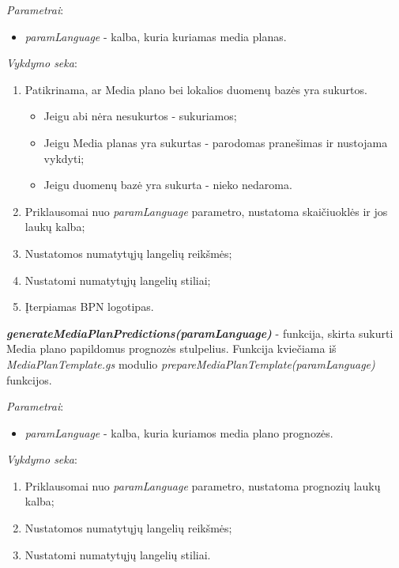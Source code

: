 \bigskip
\textit{Parametrai}:
\begin{itemize}
    \itemsep0em 
    \item \textit{paramLanguage} - kalba, kuria kuriamas media planas.
\end{itemize}

\bigskip
\textit{Vykdymo seka}:
\begin{enumerate}
    \itemsep0em 
    \item Patikrinama, ar Media plano bei lokalios duomenų bazės yra sukurtos.
    \begin{itemize}
    \itemsep0em 
        \item Jeigu abi nėra nesukurtos - sukuriamos;
        \item Jeigu Media planas yra sukurtas - parodomas pranešimas ir nustojama vykdyti;
        \item Jeigu duomenų bazė yra sukurta - nieko nedaroma.
    \end{itemize}
    \item Priklausomai nuo \textit{paramLanguage} parametro, nustatoma skaičiuoklės ir jos laukų kalba;
    \item Nustatomos numatytųjų langelių reikšmės;
    \item Nustatomi numatytųjų langelių stiliai;
    \item Įterpiamas BPN logotipas.
\end{enumerate}

\bigskip
\textit{\textbf{generateMediaPlanPredictions(paramLanguage)}} - funkcija, skirta sukurti Media plano papildomus prognozės stulpelius. Funkcija kviečiama iš \textit{MediaPlanTemplate.gs} modulio \textit{prepareMediaPlanTemplate(paramLanguage)} funkcijos.

\bigskip
\textit{Parametrai}:
\begin{itemize}
    \itemsep0em 
    \item \textit{paramLanguage} - kalba, kuria kuriamos media plano prognozės.
\end{itemize}

\bigskip
\textit{Vykdymo seka}:
\begin{enumerate}
    \itemsep0em 
    \item Priklausomai nuo \textit{paramLanguage} parametro, nustatoma prognozių laukų kalba;
    \item Nustatomos numatytųjų langelių reikšmės;
    \item Nustatomi numatytųjų langelių stiliai.
\end{enumerate}

